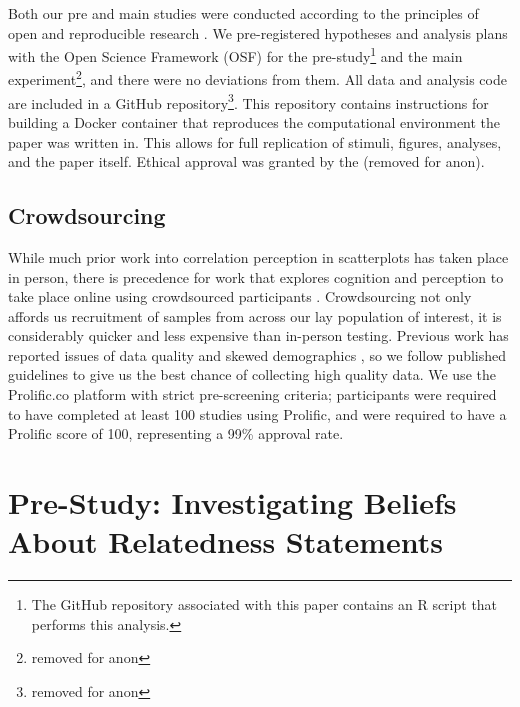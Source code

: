 \documentclass[manuscript,screen,review]{acmart}
\begin{document}
Both our pre and main studies were conducted according to the principles
of open and reproducible research \citep{ayris_2018}. We pre-registered
hypotheses and analysis plans with the Open Science Framework (OSF) for
the pre-study\footnote{The GitHub repository associated with this paper
  contains an R script that performs this analysis.} and the main
experiment\footnote{removed for anon}, and there were no deviations from
them. All data and analysis code are included in a GitHub
repository\footnote{removed for anon}. This repository contains
instructions for building a Docker container \citep{merkel_2014} that
reproduces the computational environment the paper was written in. This
allows for full replication of stimuli, figures, analyses, and the paper
itself. Ethical approval was granted by the (removed for anon).

\subsection{Crowdsourcing}\label{sec-crowdsourcing}

While much prior work into correlation perception in scatterplots has
taken place in person, there is precedence for work that explores
cognition and perception to take place online using crowdsourced
participants \citep{xiong_2022}. Crowdsourcing not only affords us
recruitment of samples from across our lay population of interest, it is
considerably quicker and less expensive than in-person testing. Previous
work has reported issues of data quality and skewed demographics
\citep{chmielewski_2020, charalambides_2021, peer_2021}, so we follow
published guidelines \citep{peer_2021} to give us the best chance of
collecting high quality data. We use the Prolific.co platform
\citep{prolific} with strict pre-screening criteria; participants were
required to have completed at least 100 studies using Prolific, and were
required to have a Prolific score of 100, representing a 99\% approval
rate.

\section{Pre-Study: Investigating Beliefs About Relatedness
Statements}\label{sec-pre-study}
\end{document}
